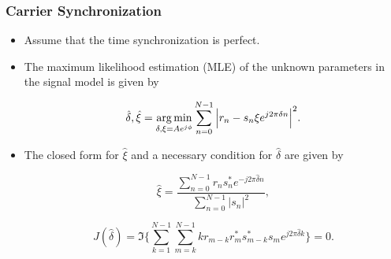 \begin{frame}
  \frametitle{Carrier Synchronization}
    \begin{itemize}
    
       \item Assume that the time synchronization is perfect.
       \item The maximum likelihood estimation (MLE) of the unknown parameters in the signal model is given by
       
       \begin{equation*}
        \label{eq:ML_f_xi}
        \hat{\delta},\hat{\xi}=\operatorname*{arg\,min}_{\delta,\xi=Ae^{j\phi}}\sum_{n=0}^{N-1}\Big|r_n-s_n\xi e^{j2\pi\delta n}\Big|^{2}.
      \end{equation*}

      \item The closed form for $\hat{\xi}$ and a necessary condition for $\hat{\delta}$ are given by
      
      
      \begin{equation*}
        \label{eq:opt_xi}
        \hat{\xi}=\frac{\sum_{n=0}^{N-1}{r_{n}s_n^{*}e^{-j2\pi\hat{\delta} n}}}{\sum_{n=0}^{N-1}|s_{n}|^2},
      \end{equation*}

      \begin{equation*}
        \label{eq:necessary condition for delta}
        J(\hat{\delta}) = \Im\bigg\{\sum_{k=1}^{N-1}{\sum_{m=k}^{N-1}{kr_{m-k}r_m^{*}s_{m-k}^{*}s_m}e^{j2\pi\hat{\delta}k}}\bigg\}=0.
      \end{equation*}

    \end{itemize}


\end{frame}


